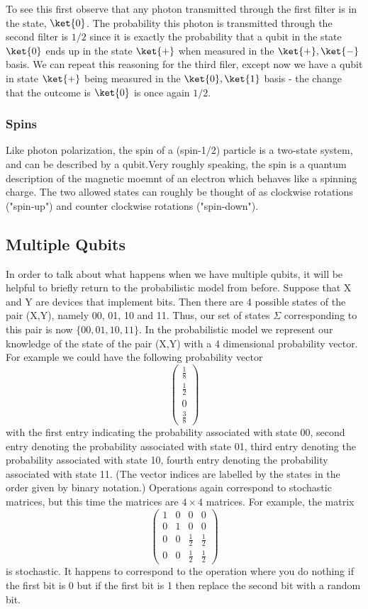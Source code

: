\documentclass[12pt, oneside]{book}
\theoremstyle{definition}
\theoremstyle{definition}
\theoremstyle{remark}
\begin{document}
To see this first observe that any photon transmitted through the first filter is in the state, $\ket{0}$. The probability this photon is transmitted through the second filter is $1/2$ since it is exactly the probability that a qubit in the state $\ket{0}$ ends up in the state $\ket{+}$ when measured in the $\ket{+},\ket{-}$ basis. We can repeat this reasoning for the third filer, except now we have a qubit in state $\ket{+}$ being measured in the $\ket{0},\ket{1}$ basis - the change that the outcome is $\ket{0}$ is once again $1/2$.

\subsubsection{Spins}
Like photon polarization, the spin of a (spin-1/2) particle is a two-state system, and can be described by a qubit.Very roughly speaking, the spin is a quantum description of the magnetic moemnt of an electron which behaves like a spinning charge. The two allowed states can roughly be thought of as clockwise rotations ("spin-up") and counter clockwise rotations ("spin-down").

\subsection{Multiple Qubits}
In order to talk about what happens when we have multiple qubits, it will be helpful to briefly return to the probabilistic model from before. Suppose that X and Y are devices that implement bits. Then there are 4 possible states of the pair (X,Y), namely 00, 01, 10 and 11. Thus, our set of states $\Sigma$ corresponding to this pair is now $\{00,01,10,11\}$. In the probabilistic model we represent our knowledge of the state of the pair (X,Y) with a 4 dimensional probability vector. For example we could have the following probability vector
\[
\begin{pmatrix} \frac{1}{8} \\ \frac{1}{2} \\ 0 \\ \frac{3}{8} \end{pmatrix}
\]
with the first entry indicating the probability associated with state 00, second entry denoting the probability associated with state 01, third entry denoting the probability associated with state 10, fourth entry denoting the probability associated with state 11. (The vector indices are labelled by the states in the order given by binary notation.) Operations again correspond to stochastic matrices, but this time the matrices are $4 \times 4$ matrices. For example, the matrix
\[
\begin{pmatrix} 1 & 0 & 0 & 0 \\ 0 & 1 & 0 & 0 \\ 0 & 0 & \frac{1}{2} & \frac{1}{2} \\ 0 & 0 & \frac{1}{2} & \frac{1}{2} \end{pmatrix}
\]
is stochastic. It happens to correspond to the operation where you do nothing if the first bit is 0 but if the first bit is 1 then replace the second bit with a random bit.
\end{document}
